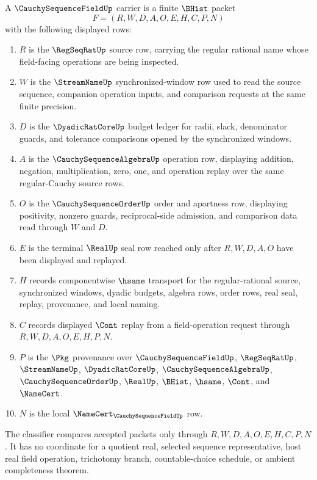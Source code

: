 \begin{definition}
\label{def:cauchy-sequence-field-carrier}
A $\CauchySequenceFieldUp$ carrier is a finite $\BHist$ packet
$$
F=(R,W,D,A,O,E,H,C,P,N)
$$
with the following displayed rows:
\begin{enumerate}
\item $R$ is the $\RegSeqRatUp$ source row, carrying the regular rational name whose field-facing operations are being inspected.
\item $W$ is the $\StreamNameUp$ synchronized-window row used to read the source sequence, companion operation inputs, and comparison requests at the same finite precision.
\item $D$ is the $\DyadicRatCoreUp$ budget ledger for radii, slack, denominator guards, and tolerance comparisons opened by the synchronized windows.
\item $A$ is the $\CauchySequenceAlgebraUp$ operation row, displaying addition, negation, multiplication, zero, one, and operation replay over the same regular-Cauchy source rows.
\item $O$ is the $\CauchySequenceOrderUp$ order and apartness row, displaying positivity, nonzero guards, reciprocal-side admission, and comparison data read through $W$ and $D$.
\item $E$ is the terminal $\RealUp$ seal row reached only after $R,W,D,A,O$ have been displayed and replayed.
\item $H$ records componentwise $\hsame$ transport for the regular-rational source, synchronized windows, dyadic budgets, algebra rows, order rows, real seal, replay, provenance, and local naming.
\item $C$ records displayed $\Cont$ replay from a field-operation request through $R,W,D,A,O,E,H,P,N$.
\item $P$ is the $\Pkg$ provenance over $\CauchySequenceFieldUp$, $\RegSeqRatUp$, $\StreamNameUp$, $\DyadicRatCoreUp$, $\CauchySequenceAlgebraUp$, $\CauchySequenceOrderUp$, $\RealUp$, $\BHist$, $\hsame$, $\Cont$, and $\NameCert$.
\item $N$ is the local $\NameCert_{\CauchySequenceFieldUp}$ row.
\end{enumerate}
The classifier compares accepted packets only through $R,W,D,A,O,E,H,C,P,N$. It has no coordinate for a quotient real, selected sequence representative, host real field operation, trichotomy branch, countable-choice schedule, or ambient completeness theorem.
\end{definition}

